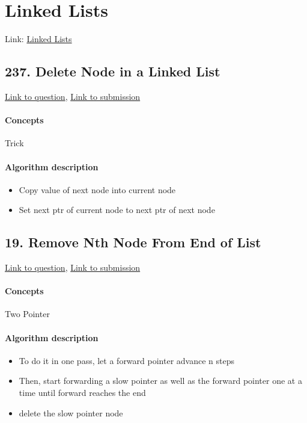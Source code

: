 \documentclass[11pt]{book}
\begin{document}
\newpage

\section{Linked Lists}
Link: \href{https://leetcode.com/explore/interview/card/top-interview-questions-easy/93/linked-list/}{Linked Lists}

\subsection{237. Delete Node in a Linked List}
\href{https://leetcode.com/problems/delete-node-in-a-linked-list/}{Link to question},
\href{https://leetcode.com/submissions/detail/333854173/}{Link to submission}
\paragraph{Concepts}
Trick
\paragraph{Algorithm description}
\begin{itemize}
    \item Copy value of next node into current node
    \item Set next ptr of current node to next ptr of next node
\end{itemize}

\subsection{19. Remove Nth Node From End of List}
\href{https://leetcode.com/problems/remove-nth-node-from-end-of-list/}{Link to question},
\href{https://leetcode.com/submissions/detail/333863765/}{Link to submission}
\paragraph{Concepts}
Two Pointer
\paragraph{Algorithm description}
\begin{itemize}
    \item To do it in one pass, let a forward pointer advance n steps
    \item Then, start forwarding a slow pointer as well as the forward pointer one at a time
          until forward reaches the end
    \item delete the slow pointer node
\end{itemize}
\end{document}
